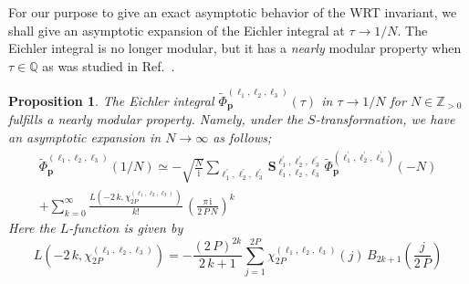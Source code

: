 \documentclass[12pt,reqno]{amsart}
\numberwithin{equation}{section}
\newtheorem{prop}[theorem]{Proposition}
\begin{document}
For our purpose to give an exact asymptotic behavior of the WRT invariant,
we shall give an asymptotic expansion of the Eichler integral
at $\tau\to 1/N$.
The Eichler integral is no longer modular, but it has a \emph{nearly}
modular property
when $\tau\in \mathbb{Q}$
as was studied in Ref.~.
\begin{prop}
  The Eichler integral
  $\widetilde{\Phi}_{\boldsymbol{p}}^{(\ell_1,\ell_2,\ell_3)}(\tau)$
  in $\tau \to 1/N$ for $N\in\mathbb{Z}_{>0}$
  fulfills a nearly modular property.
  Namely, under the $S$-transformation,
  we have an asymptotic expansion in $N\to\infty$ as follows;
  \begin{multline}
    \label{asymptotics_Eichler}
    \widetilde{\Phi}_{\boldsymbol{p}}^{(\ell_1, \ell_2, \ell_3)}(1/N)
    \simeq
    -
    \sqrt{\frac{N}{ \mathrm{i}}}
    \sum_{\ell_1^\prime, \ell_2^\prime, \ell_3^\prime}
    \mathbf{S}_{\ell_1, \ell_2, \ell_3}^{\ell_1^\prime, \ell_2^\prime,
      \ell_3^\prime} \,
    \widetilde{\Phi}_{\boldsymbol{p}}^{(\ell_1^\prime, \ell_2^\prime,
      \ell_3^\prime)}(-N)
    \\
    +
    \sum_{k=0}^\infty
    \frac{
      L(-2 \, k , \chi_{2 P}^{(\ell_1, \ell_2, \ell_3)})
    }{
      k!
    }
    \,
    \left(
      \frac{\pi \, \mathrm{i}}{
        2 \, P \, N
      }
    \right)^k
  \end{multline}
  Here the $L$-function is given by
  \begin{equation}
    \label{L_and_Bernoulli}
    L(-2 \, k , \chi_{2 P}^{(\ell_1, \ell_2, \ell_3)})
    =
    - \frac{(2 \, P)^{2 k}}{2 \, k +1}
    \sum_{j=1}^{2 P}
    \chi_{2 P}^{(\ell_1 , \ell_2 ,\ell_3)}(j) \,
    B_{2 k +1}
    \left( \frac{j}{2 \, P} \right)
  \end{equation}
\end{prop}
\end{document}
